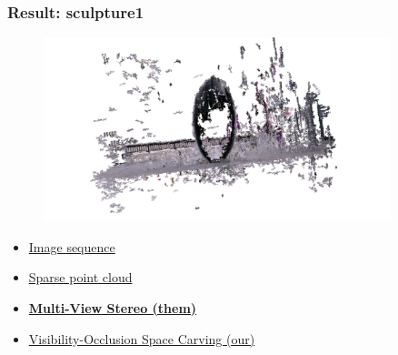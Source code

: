 \documentclass{beamer}
\begin{document}
\begin{frame}
  \frametitle{Result: sculpture1}
  \begin{figure}[htb!]
   \centering
   \includegraphics[width=0.9\textwidth]{img/sculpture1_dense}  %
  \end{figure}
  \begin{itemize}
    \item \href{run:./vid/05-result2-seq.mp4}{Image sequence} \\
    \item \href{run:./vid/06-result2-sparse.mp4}{Sparse point cloud} \\
    \item \href{run:./vid/07-result2-mvs.mp4}{\textbf{Multi-View Stereo (them)}} \\
    \item \href{run:./vid/08-result2-visocc.mp4}{Visibility-Occlusion Space Carving (our)} \\
  \end{itemize}
\end{frame}
\end{document}
